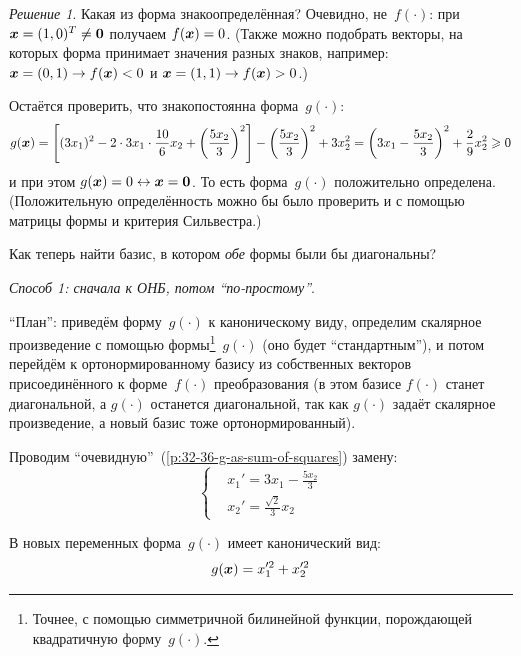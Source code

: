 \documentclass[a4paper,12pt]{article}
\theoremstyle{remark}
\newtheorem*{finalsolution}{Решение}
\begin{document}
  \begin{finalsolution}
    Какая из форма знакоопределённая?
    Очевидно, не~$f(\cdot)$: при $\bds x \hm= (1, 0)^T \hm{\not=} \bds 0$ получаем $f(\bds x) \hm= 0$.
    (Также можно подобрать векторы, на которых форма принимает значения разных знаков, например: $\bds x \hm= (0, 1) \hm\rightarrow f(\bds x) \hm< 0$ и $\bds x \hm= (1, 1) \hm\rightarrow f(\bds x) \hm> 0$.)
    
    Остаётся проверить, что знакопостоянна форма~$g(\cdot)$:
    \begin{equation}\label{p:32-36-g-as-sum-of-squares}
      g(\boldsymbol x) = \left[(3 x_1)^2 - 2 \cdot 3 x_1 \cdot \frac{10}{6} x_2 + \left(\frac{5 x_2}{3}\right)^2\right] - \left(\frac{5 x_2}{3}\right)^2 + 3 x_2^2 = \left(3 x_1 - \frac{5 x_2}{3}\right)^2 + \frac{2}{9} x_2^2 \geqslant 0
    \end{equation}
    и при этом $g(\bds x) \hm= 0 \hm\leftrightarrow \bds x \hm= \bds 0$.
    То есть форма~$g(\cdot)$ положительно определена.
    (Положительную определённость можно бы было проверить и с помощью матрицы формы и критерия Сильвестра.)
    
    Как теперь найти базис, в котором \emph{обе} формы были бы диагональны?
    
    \medskip
    
    \emph{Способ 1: сначала к ОНБ, потом ``по-простому''}.
    
    ``План'': приведём форму~$g(\cdot)$ к каноническому виду, определим скалярное произведение с помощью формы\footnote{Точнее, с помощью симметричной билинейной функции, порождающей квадратичную форму~$g(\cdot)$.}~$g(\cdot)$ (оно будет ``стандартным''), и потом перейдём к ортонормированному базису из собственных векторов присоединённого к форме~$f(\cdot)$ преобразования (в этом базисе $f(\cdot)$ станет диагональной, а $g(\cdot)$ останется диагональной, так как $g(\cdot)$ задаёт скалярное произведение, а новый базис тоже ортонормированный).
    
    Проводим ``очевидную''~(\ref{p:32-36-g-as-sum-of-squares}) замену:
    \[
      \left\{
        \begin{aligned}
          &x_1' = 3 x_1 - \frac{5 x_2}{3}\\
          &x_2' = \frac{\sqrt{2}}{3} x_2
        \end{aligned}
      \right.
    \]
    
    В новых переменных форма~$g(\cdot)$ имеет канонический вид:
    \[
      g(\boldsymbol x) = x_1^{\prime 2} + x_2^{\prime 2}
    \]
    

\end{finalsolution}
\end{document}
